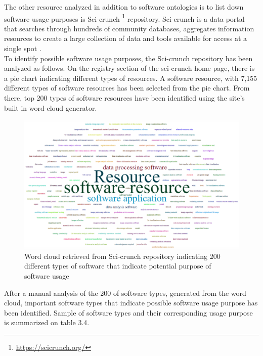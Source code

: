 The other resource analyzed in addition to software ontologies is to list down software usage purposes is Sci-crunch \footnote{\url{https://scicrunch.org/}} repository. Sci-crunch is a data portal that searches through hundreds of community databases, aggregates information resources to create a large collection of data and tools available for access at a single spot \citep{grethe2016scicrunch}. \\

To identify possible software usage purposes, the Sci-crunch repository has been analyzed as follows. On the registry section of the sci-crunch home page, there is a pie chart indicating different types of resources. A software resource, with  7,155 different types of software resources has been selected from the pie chart. From there, top 200 types of software resources have been identified using the site’s built in word-cloud generator. \\
 

\begin{figure}[htbp]
	\centering
	\includegraphics[width=.75\textwidth]{4.graphics/figures/ch_3/cloud}
	\caption{Word cloud retrieved from Sci-crunch repository indicating 200 different types of software that  indicate potential purpose of software usage}
	\label{fig:chapter03:setup}
\end{figure}

After a manual analysis of the 200 of software types, generated from the word cloud, important software types that indicate possible software usage purpose has been identified. Sample of software types and their corresponding usage purpose is summarized on table 3.4.

